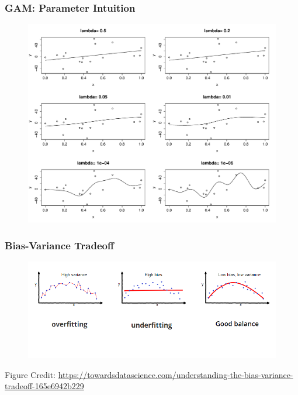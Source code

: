 \documentclass{beamer}
\begin{document}
\begin{frame}
\frametitle{GAM: Parameter Intuition}
\begin{figure}

\includegraphics[scale=.35]{figures/splineDiffLambda}
\end{figure}
\end{frame}

\begin{frame}
\frametitle{Bias-Variance Tradeoff}

\begin{figure}

\includegraphics[scale=.35]{figures/biasVarianceTradeoff}

\end{figure}


Figure Credit: \url{https://towardsdatascience.com/understanding-the-bias-variance-tradeoff-165e6942b229}


\end{frame}
\end{document}

